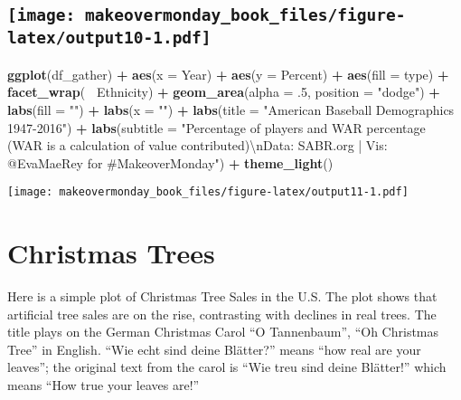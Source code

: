 \documentclass[]{book}
\newenvironment{Shaded}{\begin{snugshade}}{\end{snugshade}}
\newcommand{\KeywordTok}[1]{\textcolor[rgb]{0.13,0.29,0.53}{\textbf{#1}}}
\newcommand{\DataTypeTok}[1]{\textcolor[rgb]{0.13,0.29,0.53}{#1}}
\newcommand{\DecValTok}[1]{\textcolor[rgb]{0.00,0.00,0.81}{#1}}
\newcommand{\CharTok}[1]{\textcolor[rgb]{0.31,0.60,0.02}{#1}}
\newcommand{\StringTok}[1]{\textcolor[rgb]{0.31,0.60,0.02}{#1}}
\newcommand{\OperatorTok}[1]{\textcolor[rgb]{0.81,0.36,0.00}{\textbf{#1}}}
\newcommand{\NormalTok}[1]{#1}
\theoremstyle{definition}
\theoremstyle{definition}
\theoremstyle{definition}
\theoremstyle{remark}
\begin{document}
\section[]{\texorpdfstring{\protect\texttt{[image: makeovermonday\_book\_files/figure-latex/output10-1.pdf]}}{}}\label{section-9}

\clearpage

\begin{Shaded}
\begin{Highlighting}[]
\KeywordTok{ggplot}\NormalTok{(df_gather) }\OperatorTok{+}
\StringTok{  }\KeywordTok{aes}\NormalTok{(}\DataTypeTok{x =}\NormalTok{ Year) }\OperatorTok{+}
\StringTok{  }\KeywordTok{aes}\NormalTok{(}\DataTypeTok{y =}\NormalTok{ Percent) }\OperatorTok{+}
\StringTok{  }\KeywordTok{aes}\NormalTok{(}\DataTypeTok{fill =}\NormalTok{ type) }\OperatorTok{+}
\StringTok{  }\KeywordTok{facet_wrap}\NormalTok{(}\OperatorTok{~}\StringTok{ }\NormalTok{Ethnicity) }\OperatorTok{+}
\StringTok{  }\KeywordTok{geom_area}\NormalTok{(}\DataTypeTok{alpha =}\NormalTok{ .}\DecValTok{5}\NormalTok{, }\DataTypeTok{position =} \StringTok{"dodge"}\NormalTok{) }\OperatorTok{+}
\StringTok{  }\KeywordTok{labs}\NormalTok{(}\DataTypeTok{fill =} \StringTok{""}\NormalTok{) }\OperatorTok{+}
\StringTok{  }\KeywordTok{labs}\NormalTok{(}\DataTypeTok{x =} \StringTok{""}\NormalTok{) }\OperatorTok{+}
\StringTok{  }\KeywordTok{labs}\NormalTok{(}\DataTypeTok{title =} \StringTok{"American Baseball Demographics 1947-2016"}\NormalTok{) }\OperatorTok{+}
\StringTok{  }\KeywordTok{labs}\NormalTok{(}\DataTypeTok{subtitle =} \StringTok{"Percentage of players and WAR percentage (WAR is a calculation of value contributed)}\CharTok{\textbackslash{}n}\StringTok{Data: SABR.org | Vis: @EvaMaeRey for #MakeoverMonday"}\NormalTok{) }\OperatorTok{+}
\StringTok{  }\KeywordTok{theme_light}\NormalTok{() }
\end{Highlighting}
\end{Shaded}

\texttt{[image: makeovermonday\_book\_files/figure-latex/output11-1.pdf]}

\chapter{Christmas Trees}\label{christmas-trees}

Here is a simple plot of Christmas Tree Sales in the U.S. The plot shows
that artificial tree sales are on the rise, contrasting with declines in
real trees. The title plays on the German Christmas Carol ``O
Tannenbaum'', ``Oh Christmas Tree'' in English. ``Wie echt sind deine
Blätter?'' means ``how real are your leaves''; the original text from
the carol is ``Wie treu sind deine Blätter!'' which means ``How true
your leaves are!''
\end{document}
